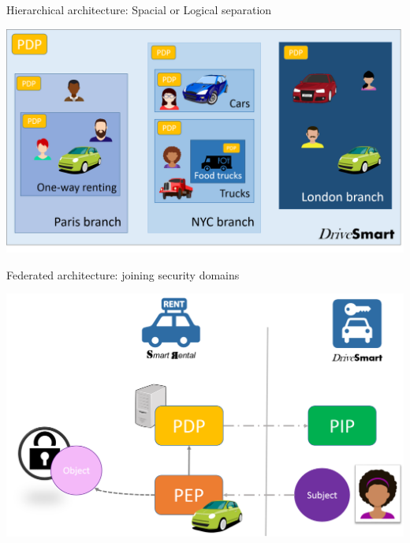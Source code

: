 \begin{frame}{Hierarchical architecture: Spacial or Logical separation}
    \begin{center}
        \includegraphics[scale=0.36]{Figures/hierarchical_archi_car.png}        
        \end{center}
\end{frame}


\begin{frame}{Federated architecture: joining security domains}
    \begin{center}
        \includegraphics[scale=0.4]{Figures/federated_archi.png}
    \end{center}    
\end{frame}


